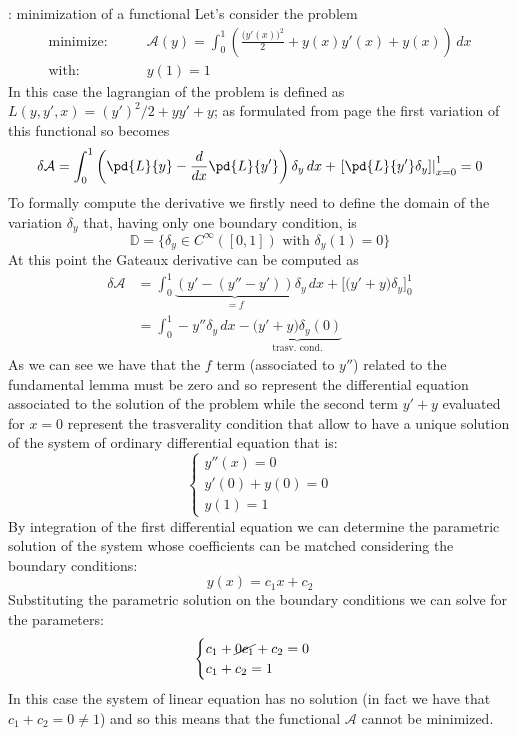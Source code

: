 	\begin{example}{: minimization of a functional}
		Let's consider the problem
		\begin{align*}
			\textrm{minimize:}& \qquad \mathcal A(y) = \int_0^1 \left( \frac{\big(y'(x)\big)^2}{2} + y(x)y'(x) + y(x) \right)\, dx \\
			\textrm{with:}& \qquad y(1) = 1
		\end{align*}
		In this case the lagrangian of the problem is defined as $L (y,y',x) = (y')^2/2 + y y' + y$; as formulated from page \pageref{sec:func:eullag} the first variation of this functional so becomes
		\[ \delta \mathcal A = \int_0^1 \left( \pd{L }{y} - \frac{d}{dx} \pd{L }{y'} \right)\delta_y\, dx + \left. \left[ \pd{L }{y'} \delta_y\right] \right|_{x = 0}^1 = 0 \]
		To formally compute the derivative we firstly need to define the domain of the variation $\delta_y$ that, having only one boundary condition, is
		\[ \mathds D = \{ \delta_y \in C^\infty([0,1]) \textrm{ with } \delta_y(1) = 0\} \]
		At this point the Gateaux derivative can be computed as
		\begin{align*}
			\delta \mathcal A & = \int_0^1 \underbrace{\left( y' - (y'' - y') \right) }_{=f} \delta_y \, dx + \Big[ \big(y'+y\big) \delta_y \Big]_0^1 \\
			& = \int_0^1 -y'' \delta_y\, dx - \underbrace{\big(y'+y\big)\delta_y(0)}_\textrm{trasv. cond.}
		\end{align*}
		As we can see we have that the $f$ term (associated to $y''$) related to the fundamental lemma must be zero and so represent the differential equation associated to the solution of the problem while the second term $y'+y$ evaluated for $x = 0$ represent the trasverality condition that allow to have a unique solution of the system of ordinary differential equation that is:
		\[ \begin{cases}
			y''(x) = 0 \\ 
			y'(0) + y(0) = 0 \\
			y(1) = 1
		\end{cases} \]
		By integration of the first differential equation we can determine the parametric solution of the system whose coefficients can be matched considering the boundary conditions:
		\[ y(x) = c_1x + c_2 \]
		Substituting the parametric solution on the boundary conditions we can solve for the parameters:
		\[ \begin{cases}
			c_1 + \cancel{0c_1} + c_2 = 0 \\ c_1+c_2 = 1
		\end{cases} \]
		In this case the system of linear equation has no solution (in fact we have that $c_1 + c_2 = 0 \neq 1$) and so this means that the functional $\mathcal A$ cannot be minimized.
		
	\end{example}
	
